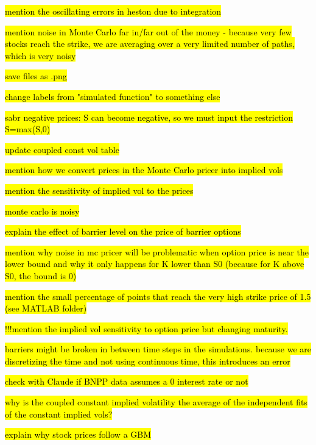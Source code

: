 \hl{mention the oscillating errors in heston due to integration}

\hl{mention noise in Monte Carlo far in/far out of the money - because very few stocks reach the strike, we are averaging over a very limited number of paths, which is very noisy}

\hl{save files as .png}

\hl{change labels from "simulated function" to something else}

\hl{sabr negative prices: S can become negative, so we must input the restriction S=max(S,0)}

\hl{update coupled const vol table}

\hl{mention how we convert prices in the Monte Carlo pricer into implied vols}

\hl{mention the sensitivity of implied vol to the prices}

\hl{monte carlo is noisy}

\hl{explain the effect of barrier level on the price of barrier options}

\hl{mention why noise in mc pricer will be problematic when option price is near the lower bound and why it only happens for K lower than S0 (because for K above S0, the bound is 0)}

\hl{mention the small percentage of points that reach the very high strike price of 1.5 (see MATLAB folder)}

\hl{!!!mention the implied vol sensitivity to option price but changing maturity.}

\hl{barriers might be broken in between time steps in the simulations. because we are discretizing the time and not using continuous time, this introduces an error}

\hl{check with Claude if BNPP data assumes a 0 interest rate or not}

\hl{why is the coupled constant implied volatility the average of the independent fits of the constant implied vols?}

\hl{explain why stock prices follow a GBM}